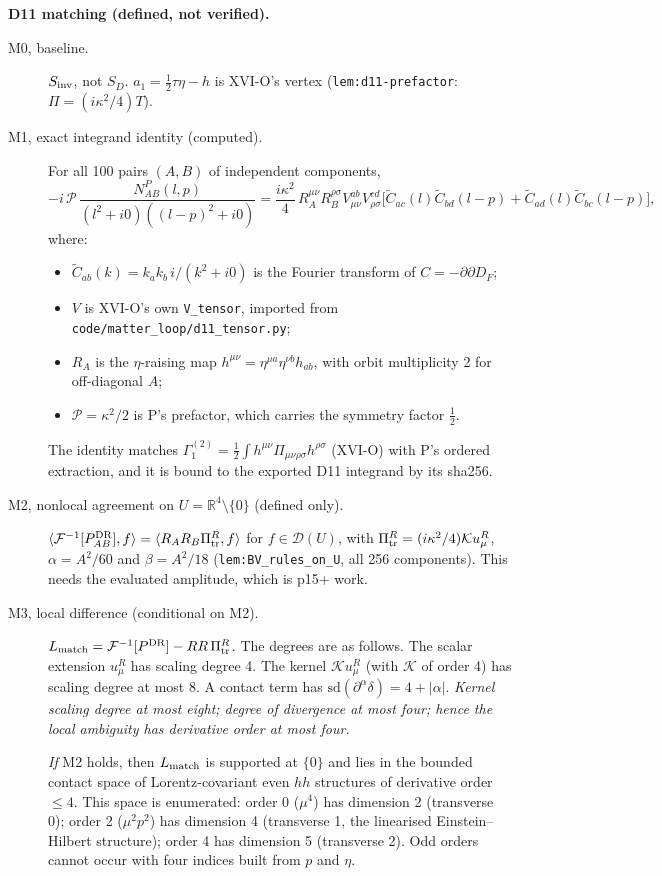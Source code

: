 \textbf{D11 matching (defined, not verified).}
\begin{description}
\item[M0, baseline.] $S_{\rm inv}$, not $S_D$. $a_1=\tfrac12\tau\eta-h$ is XVI-O's vertex (\texttt{lem:d11-prefactor}:
$\Pi=(i\kappa^2/4)T$).
\item[M1, exact integrand identity (computed).] For all 100 pairs $(A,B)$ of independent components,
\[-i\,\mathcal P\,\frac{N^{P}_{AB}(l,p)}{(l^2+i0)((l-p)^2+i0)}=\frac{i\kappa^2}{4}\,R_A^{\mu\nu}R_B^{\rho\sigma}
V^{ab}_{\mu\nu}V^{cd}_{\rho\sigma}\big[\tilde C_{ac}(l)\tilde C_{bd}(l-p)+\tilde C_{ad}(l)\tilde C_{bc}(l-p)\big],\]
where:
\begin{itemize}
\item $\tilde C_{ab}(k)=k_ak_b\,i/(k^2+i0)$ is the Fourier transform of $C=-\partial\partial D_F$;
\item $V$ is XVI-O's own \texttt{V\_tensor}, imported from \texttt{code/matter\_loop/d11\_tensor.py};
\item $R_A$ is the $\eta$-raising map $h^{\mu\nu}=\eta^{\mu a}\eta^{\nu b}h_{ab}$, with orbit multiplicity 2 for
off-diagonal $A$;
\item $\mathcal P=\kappa^2/2$ is P's prefactor, which carries the symmetry factor $\tfrac12$.
\end{itemize}
The identity matches $\Gamma^{(2)}_1=\tfrac12\int h^{\mu\nu}\Pi_{\mu\nu\rho\sigma}h^{\rho\sigma}$ (XVI-O) with P's ordered
extraction, and it is bound to the exported D11 integrand by its sha256.
\item[M2, nonlocal agreement on $U=\mathbb R^4\setminus\{0\}$ (defined only).]
$\langle\mathcal F^{-1}[P^{\rm DR}_{AB}],f\rangle=\langle R_AR_B\Pi^R_{\rm tr},f\rangle$ for $f\in\mathcal D(U)$, with
$\Pi^R_{\rm tr}=(i\kappa^2/4)\mathcal K u^R_\mu$, $\alpha=A^2/60$ and $\beta=A^2/18$ (\texttt{lem:BV\_rules\_on\_U},
all 256 components). This needs the evaluated amplitude, which is p15+ work.
\item[M3, local difference (conditional on M2).] $L_{\rm match}=\mathcal F^{-1}[P^{\rm DR}]-R R\,\Pi^R_{\rm tr}$.
The degrees are as follows. The scalar extension $u^R_\mu$ has scaling degree 4. The kernel $\mathcal Ku^R_\mu$
(with $\mathcal K$ of order 4) has scaling degree at most 8. A contact term has $\mathrm{sd}(\partial^\alpha\delta)=4+|\alpha|$.
\emph{Kernel scaling degree at most eight; degree of divergence at most four; hence the local ambiguity has derivative
order at most four.}

\emph{If} M2 holds, then $L_{\rm match}$ is supported at $\{0\}$ and lies in the bounded contact space of Lorentz-covariant
even $hh$ structures of derivative order $\le4$. This space is enumerated: order 0 ($\mu^4$) has dimension 2 (transverse 0);
order 2 ($\mu^2p^2$) has dimension 4 (transverse 1, the linearised Einstein--Hilbert structure); order 4 has dimension 5
(transverse 2). Odd orders cannot occur with four indices built from $p$ and $\eta$.


\end{description}
